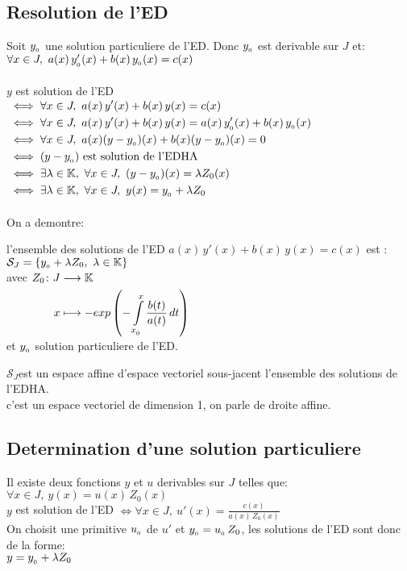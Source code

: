 \documentclass[12pt,twoside,a4paper]{article}
\begin{document}
		\subsection{Resolution de l'ED}
			Soit $y_{_{0}}$ une solution particuliere de l'ED. Donc $y_{_{0}}$ est derivable sur $J$ et:\\
			$\forall x\in J,\ a(x)\,y\uu0'(x)+b(x)\,y\uu0(x)=c(x)$\\
			\\
			$y$ est solution de l'ED\\
			$\begin{aligned}&\iff\forall x\in J,\ a(x)\,y'(x)+b(x)\,y(x)=c(x)\\
				&\iff\forall x\in J,\ a(x)\,y'(x)+b(x)\,y(x)=a(x)\,y\uu0'(x)+b(x)\,y\uu0(x)\\
				&\iff\forall x\in J,\ a(x)(y-y\uu0)(x)+b(x)(y-y\uu0)(x)=0\\
				&\iff(y-y\uu0)\text{ est solution de l'EDHA}\\
				&\iff\exists\lambda\in\mathbb{K},\ \forall x\in J,\ (y-y\uu0)(x)=\lambda Z_0(x)\\
				&\iff\exists\lambda\in\mathbb{K},\ \forall x\in J,\ y(x)=y\uu0+\lambda Z_0\end{aligned}$\\
			\\
			On a demontre:
			\begin{prop}
				\begin{liste}
					\item l'ensemble des solutions de l'ED $a(x)\,y'(x)+b(x)\,y(x)=c(x)$ est :\\
						$\mathcal{S}_J=\left\{y\uu0+\lambda Z_0,\ \lambda\in\mathbb{K}\right\}$\\
						avec $\begin{aligned}[t]Z_0\colon J&\longrightarrow\mathbb{K} \\x&\longmapsto-exp\left(-\int\limits_{x_{_{0}}}^x\frac{b(t)}{a(t)}\,dt\right)\end{aligned}$\\
						et $y_{_{0}}$ solution particuliere de l'ED.
					\item $\mathcal{S}_J$est un espace affine d'espace vectoriel sous-jacent l'ensemble des solutions de l'EDHA.\\
		c'est un espace vectoriel de dimension 1, on parle de droite affine.
				\end{liste}
			\end{prop}
		\subsection{Determination d'une solution particuliere}
			Il existe deux fonctions $y$ et $u$ derivables sur $J$ telles que:\\
			$\forall x\in J,\ y(x)=u(x)\,Z_0(x)$\\
			$y$ est solution de l'ED $\iff \forall x\in J,\ u'(x)=\frac{c(x)}{a(x)\,Z_0(x)}$\\
			On choisit une primitive $u_{_{0}}$ de $u'$ et $y_{_{0}}=u_{_{0}}\,Z_0$, les solutions de l'ED sont donc de la forme:\\
			$y=y_{_{0}}+\lambda Z_0$
\end{document}
